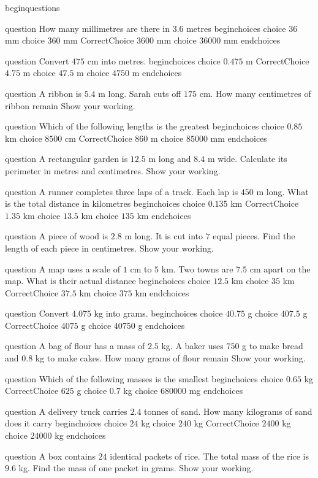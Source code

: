 begin{questions}

question How many millimetres are there in $3.6$ metres
begin{choices}
  choice $36$ mm
  choice $360$ mm
  CorrectChoice $3600$ mm
  choice $36000$ mm
end{choices}

question Convert $475$ cm into metres.
begin{choices}
  choice $0.475$ m
  CorrectChoice $4.75$ m
  choice $47.5$ m
  choice $4750$ m
end{choices}

question A ribbon is $5.4$ m long. Sarah cuts off $175$ cm.
How many centimetres of ribbon remain
Show your working.

question Which of the following lengths is the greatest
begin{choices}
  choice $0.85$ km
  choice $8500$ cm
  CorrectChoice $860$ m
  choice $85000$ mm
end{choices}

question A rectangular garden is $12.5$ m long and $8.4$ m wide.
Calculate its perimeter in metres and centimetres.
Show your working.

question A runner completes three laps of a track.
Each lap is $450$ m long.
What is the total distance in kilometres
begin{choices}
  choice $0.135$ km
  CorrectChoice $1.35$ km
  choice $13.5$ km
  choice $135$ km
end{choices}

question A piece of wood is $2.8$ m long.
It is cut into $7$ equal pieces.
Find the length of each piece in centimetres.
Show your working.

question A map uses a scale of $1$ cm to $5$ km.
Two towns are $7.5$ cm apart on the map.
What is their actual distance
begin{choices}
  choice $12.5$ km
  choice $35$ km
  CorrectChoice $37.5$ km
  choice $375$ km
end{choices}

question Convert $4.075$ kg into grams.
begin{choices}
  choice $40.75$ g
  choice $407.5$ g
  CorrectChoice $4075$ g
  choice $40750$ g
end{choices}

question A bag of flour has a mass of $2.5$ kg.
A baker uses $750$ g to make bread and $0.8$ kg to make cakes.
How many grams of flour remain
Show your working.

question Which of the following masses is the smallest
begin{choices}
  choice $0.65$ kg
  CorrectChoice $625$ g
  choice $0.7$ kg
  choice $680000$ mg
end{choices}

question A delivery truck carries $2.4$ tonnes of sand.
How many kilograms of sand does it carry
begin{choices}
  choice $24$ kg
  choice $240$ kg
  CorrectChoice $2400$ kg
  choice $24000$ kg
end{choices}

question A box contains $24$ identical packets of rice.
The total mass of the rice is $9.6$ kg.
Find the mass of one packet in grams.
Show your working.

